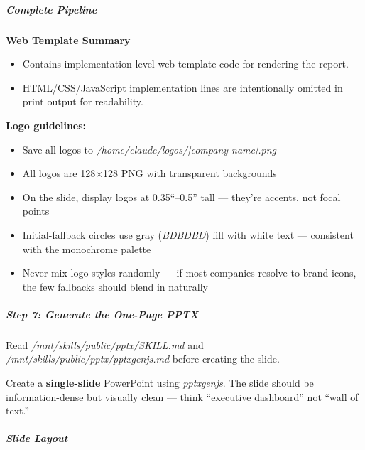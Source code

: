\documentclass[11pt]{article}
\begin{document}
\subparagraph{Complete Pipeline}\mbox{}\par

\textbf{Web Template Summary}
\begin{itemize}[leftmargin=*,itemsep=2pt,topsep=2pt]
\item {} Contains implementation-level web template code for rendering the report.
\item {} HTML/CSS/JavaScript implementation lines are intentionally omitted in print output for readability.
\end{itemize}

\textbf{Logo guidelines:}

\begin{itemize}[leftmargin=*,itemsep=2pt,topsep=2pt]
\item {} Save all logos to \emph{/home/claude/logos/[company-name].png}
\item {} All logos are 128×128 PNG with transparent backgrounds
\item {} On the slide, display logos at 0.35``–0.5'' tall — they're accents, not focal points
\item {} Initial-fallback circles use gray (\emph{BDBDBD}) fill with white text — consistent with the monochrome palette
\item {} Never mix logo styles randomly — if most companies resolve to brand icons, the few fallbacks should blend in naturally
\end{itemize}

\subparagraph{Step 7: Generate the One-Page PPTX}\mbox{}\par

Read \emph{/mnt/skills/public/pptx/SKILL.md} and \emph{/mnt/skills/public/pptx/pptxgenjs.md} before creating the slide.


Create a \textbf{single-slide} PowerPoint using \emph{pptxgenjs}. The slide should be information-dense but visually clean — think ``executive dashboard'' not ``wall of text.''


\subparagraph{Slide Layout}\mbox{}\par
\end{document}
